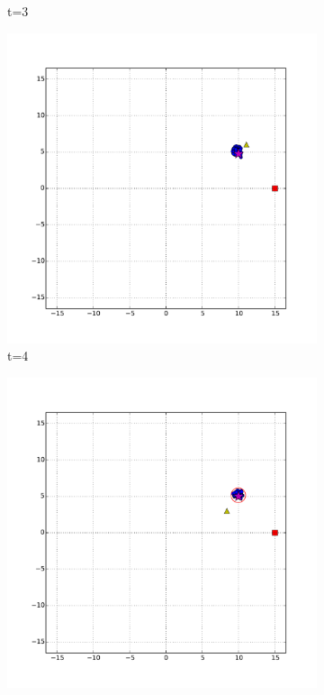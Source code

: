 \begin{figure}
\begin{subfigure}[b]{0.3\textwidth}
                \caption{t=3}
                \label{fig:bad_heading_t_3}
        \end{subfigure}
        \begin{subfigure}[b]{0.3\textwidth}
                \includegraphics[width=\textwidth]{bad_heading_t_4}
                \caption{t=4}
                \label{fig:bad_heading_t_4}
        \end{subfigure}
        \begin{subfigure}[b]{0.3\textwidth}
                \includegraphics[width=\textwidth]{bad_heading_t_5}

\end{subfigure}
\end{figure}
